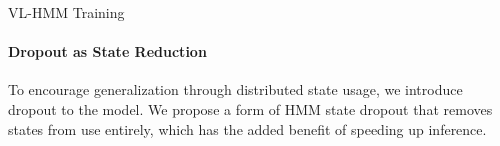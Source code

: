 \documentclass[11pt,a4paper]{article}
\begin{document}
\begin{algorithm}[t]
\begin{algorithmic}
    \EndFor

\end{algorithmic}
\caption{
\label{fig:algo}
VL-HMM Training
}
\end{algorithm}


\paragraph{Dropout as State Reduction}


To encourage generalization through distributed state usage, we introduce dropout to the model. 
We propose a form of HMM state dropout that removes states from use entirely,
which has the added benefit of speeding up inference.

\end{document}
